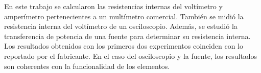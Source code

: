 En este trabajo se calcularon las resistencias internas del voltímetro y amperímetro pertenecientes a un multímetro comercial. También se midió la resistencia interna del voltímetro de un osciloscopio. Además, se estudió la transferencia de potencia de una fuente para determinar su resistencia interna. Los resultados obtenidos con los primeros dos experimentos coinciden con lo reportado por el fabricante. En el caso del osciloscopio y la fuente, los resultados son coherentes con la funcionalidad de los elementos.